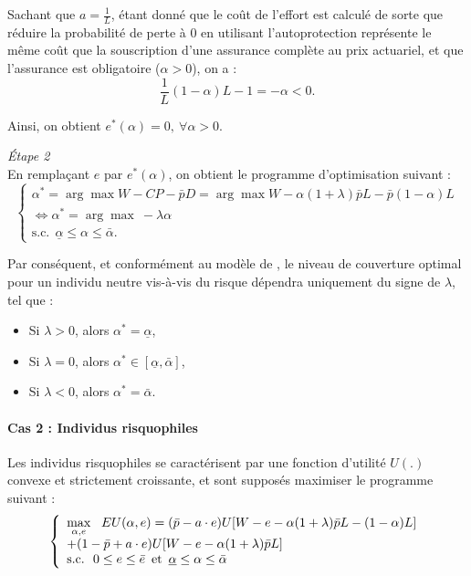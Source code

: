 \begin{Article}
\begin{refsection}[Mouminoux]
\begin{appendices}
Sachant que $a=\frac{1}{L}$, étant donné que le coût de l'effort est calculé de sorte que réduire la probabilité de perte à 0 en utilisant l'autoprotection représente le même coût que la souscription d'une assurance complète au prix actuariel, et que l'assurance est obligatoire ($\alpha > 0$), on a :
\begin{equation}
\frac{1}{L}(1-\alpha )L-1=-\alpha<0.
\end{equation}

Ainsi, on obtient $e^*(\alpha)=0,~ \forall \alpha>0$.

\clearpage

\textit{Étape 2} \\

En remplaçant $e$ par $e^*(\alpha)$, on obtient le programme d'optimisation suivant :
\begin{equation}
\left\{
    \begin{array}{ll}
\alpha^* = \arg\max W - CP - \bar{p}D = \arg\max W - \alpha(1+\lambda)\bar{p}L - \bar{p}(1 - \alpha)L \\
\Leftrightarrow \alpha^* = \arg\max ~ -\lambda \alpha \\
    \text{s.c.} ~~\underline{\alpha} \leq \alpha \leq \bar{\alpha}.
    \end{array}
\right.
\end{equation}

Par conséquent, et conformément au modèle de \textcite{m68}, le niveau de couverture optimal pour un individu neutre vis-à-vis du risque dépendra uniquement du signe de $\lambda$, tel que :
\begin{itemize}
  \item Si $\lambda>0$, alors $\alpha^*=\underline{\alpha}$,
  \item Si $\lambda=0$, alors $\alpha^* \in [\underline{\alpha},\bar{\alpha} ]$,
  \item Si $\lambda<0$, alors $\alpha^*=\bar{\alpha} $.
\end{itemize}

\paragraph*{Cas 2 : Individus risquophiles}

Les individus risquophiles se caractérisent par une fonction d'utilité $U(.)$ convexe et strictement croissante, et sont supposés maximiser le programme suivant :
\begin{equation}
\left\{
    \begin{array}{ll}
   \displaystyle \max_{\alpha, e} ~~EU(\alpha,e)=(\bar{p}-a\cdot e)U[W - e -\alpha(1+\lambda)\bar{p}L - (1 - \alpha)L] \\
   + (1 - \bar{p}+a\cdot e)U[W - e - \alpha(1 + \lambda)\bar{p}L] \\
     \text{s.c.} ~~0 \le e \le \bar{e}\enskip \text{et}\enskip \underline{\alpha} \le \alpha \le \bar{\alpha}
    \end{array}
\right.
\end{equation}


\end{appendices}
\end{refsection}
\end{Article}
